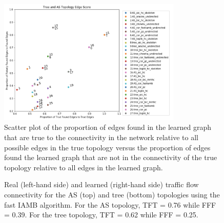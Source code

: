 \documentclass[conference]{IEEEtran}
\begin{document}
\begin{figure}[h!]
\centering
    \includegraphics[height=6cm]{images/edge_scores.png}
    \caption{Scatter plot of the proportion of edges found in the learned graph that are true to the connectivity in the network relative to all possible edges in the true topology versus the proportion of edges found the learned graph that are not in the connectivity of the true topology relative to all edges in the learned graph. 
}
\label{fig:edges}
\end{figure}

\begin{figure}%
    \centering
    \qquad
    \caption{Real (left-hand side) and learned (right-hand side) traffic flow connectivity for the AS (top) and tree (bottom) topologies using the fast IAMB algorithm. For the AS topology, TFT = 0.76 while FFF = 0.39. For the tree topology, TFT = 0.62 while FFF = 0.25.}
    \label{fig:graphs}

\end{figure}
\end{document}
